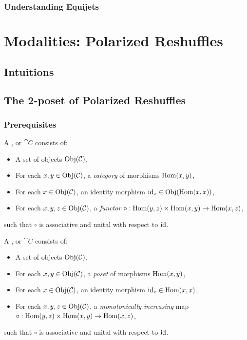 \documentclass[a4paper]{memoir}
\begin{document}
\subsection{Understanding Equijets}

\chapter{Modalities: Polarized Reshuffles} \label{ch:modalities}

\section{Intuitions}

\section{The 2-poset of Polarized Reshuffles}

\subsection{Prerequisites}
\begin{definition}
	A ,  or  $\cat C$ consists of:
	\begin{itemize}
		\item A set of objects $\mathrm{Obj}(\mathcal{C})$,
		\item For each $x, y \in \mathrm{Obj}(\mathcal{C})$, a \emph{category} of morphisms ${\mathrm{Hom}}(x, y)$,
		\item For each $x \in \mathrm{Obj}(\mathcal{C})$, an identity morphism $\mathrm{id}_x \in \mathrm{Obj}({\mathrm{Hom}}(x, x))$,
		\item For each $x, y, z \in \mathrm{Obj}(\mathcal{C})$, a \emph{functor} $\circ : {\mathrm{Hom}}(y, z) \times {\mathrm{Hom}}(x, y) \to {\mathrm{Hom}}(x, z)$,
	\end{itemize}
	such that $\circ$ is associative and unital with respect to $\mathrm{id}$.
\end{definition}
\begin{definition}
	A ,  or  $\cat C$ consists of:
	\begin{itemize}
		\item A set of objects $\mathrm{Obj}(\mathcal{C})$,
		\item For each $x, y \in \mathrm{Obj}(\mathcal{C})$, a \emph{poset} of morphisms ${\mathrm{Hom}}(x, y)$,
		\item For each $x \in \mathrm{Obj}(\mathcal{C})$, an identity morphism $\mathrm{id}_x \in {\mathrm{Hom}}(x, x)$,
		\item For each $x, y, z \in \mathrm{Obj}(\mathcal{C})$, a \emph{monotonically increasing} map $\circ : {\mathrm{Hom}}(y, z) \times {\mathrm{Hom}}(x, y) \to {\mathrm{Hom}}(x, z)$,
	\end{itemize}
	such that $\circ$ is associative and unital with respect to $\mathrm{id}$.
\end{definition}
\end{document}
